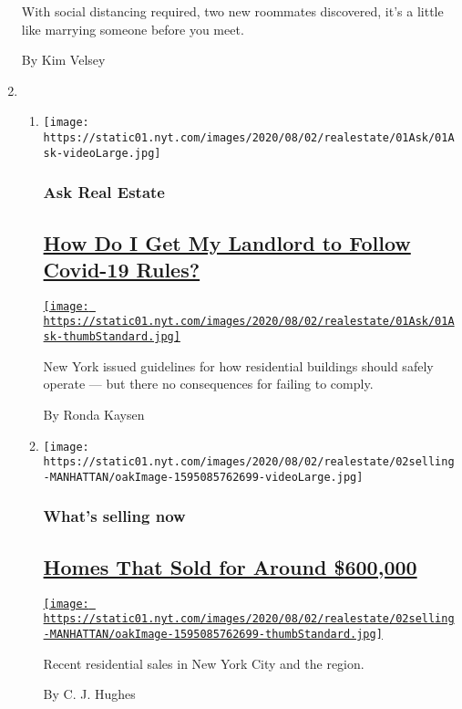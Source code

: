 \begin{enumerate}
  With social distancing required, two new roommates discovered, it's a
  little like marrying someone before you meet.

  By Kim Velsey
\item
  \begin{enumerate}
  \def\labelenumii{\arabic{enumii}.}
  \item
    \texttt{[image: https://static01.nyt.com/images/2020/08/02/realestate/01Ask/01Ask-videoLarge.jpg]}

    \hypertarget{ask-real-estate}{%
    \subsubsection{Ask Real Estate}\label{ask-real-estate}}

    \hypertarget{how-do-i-get-my-landlord-to-follow-covid-19-rules}{%
    \subsection{\texorpdfstring{\href{/2020/08/01/realestate/coronavirus-covid-apartment-buildings.html}{How
    Do I Get My Landlord to Follow Covid-19
    Rules?}}{How Do I Get My Landlord to Follow Covid-19 Rules?}}\label{how-do-i-get-my-landlord-to-follow-covid-19-rules}}

    \href{/2020/08/01/realestate/coronavirus-covid-apartment-buildings.html}{\texttt{[image: https://static01.nyt.com/images/2020/08/02/realestate/01Ask/01Ask-thumbStandard.jpg]}}

    New York issued guidelines for how residential buildings should
    safely operate --- but there no consequences for failing to comply.

    By Ronda Kaysen
  \item
    \texttt{[image: https://static01.nyt.com/images/2020/08/02/realestate/02selling-MANHATTAN/oakImage-1595085762699-videoLarge.jpg]}

    \hypertarget{whats-selling-now}{%
    \subsubsection{What's selling now}\label{whats-selling-now}}

    \hypertarget{homes-that-sold-for-around-600000}{%
    \subsection{\texorpdfstring{\href{/2020/08/02/realestate/homes-that-sold-for-around-600000.html}{Homes
    That Sold for Around
    \$600,000}}{Homes That Sold for Around \$600,000}}\label{homes-that-sold-for-around-600000}}

    \href{/2020/08/02/realestate/homes-that-sold-for-around-600000.html}{\texttt{[image: https://static01.nyt.com/images/2020/08/02/realestate/02selling-MANHATTAN/oakImage-1595085762699-thumbStandard.jpg]}}

    Recent residential sales in New York City and the region.

    By C. J. Hughes
  \end{enumerate}
\end{enumerate}

